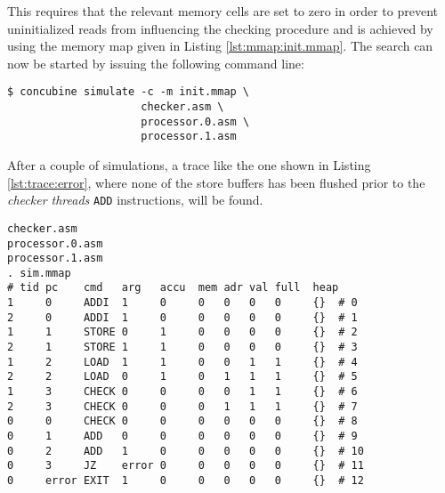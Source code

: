 This requires that the relevant memory cells are set to zero in order to prevent uninitialized reads from influencing the checking procedure and is achieved by using the memory map given in Listing \ref{lst:mmap:init.mmap}.
The search can now be started by issuing the following command line:

\begin{verbatim}
$ concubine simulate -c -m init.mmap \
                     checker.asm \
                     processor.0.asm \
                     processor.1.asm
\end{verbatim}

After a couple of simulations, a trace like the one shown in Listing \ref{lst:trace:error}, where none of the store buffers has been flushed prior to the \emph{checker threads} \texttt{ADD} instructions, will be found.

\begin{lstlisting}[language={[concubine]Assembler}, caption={Sequentially Inconsistent Trace}, label={lst:trace:error}, xleftmargin=\parindent]
checker.asm
processor.0.asm
processor.1.asm
. sim.mmap
# tid pc    cmd   arg   accu  mem adr val full  heap
1     0     ADDI  1     0     0   0   0   0     {}  # 0
2     0     ADDI  1     0     0   0   0   0     {}  # 1
1     1     STORE 0     1     0   0   0   0     {}  # 2
2     1     STORE 1     1     0   0   0   0     {}  # 3
1     2     LOAD  1     1     0   0   1   1     {}  # 4
2     2     LOAD  0     1     0   1   1   1     {}  # 5
1     3     CHECK 0     0     0   0   1   1     {}  # 6
2     3     CHECK 0     0     0   1   1   1     {}  # 7
0     0     CHECK 0     0     0   0   0   0     {}  # 8
0     1     ADD   0     0     0   0   0   0     {}  # 9
0     2     ADD   1     0     0   0   0   0     {}  # 10
0     3     JZ    error 0     0   0   0   0     {}  # 11
0     error EXIT  1     0     0   0   0   0     {}  # 12
\end{lstlisting}
